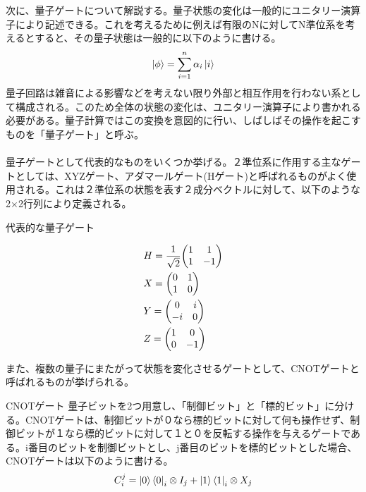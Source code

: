 \documentclass[a4paper,10.5pt]{article}
\numberwithin{equation}{section}
\begin{document}
次に、量子ゲートについて解説する。量子状態の変化は一般的にユニタリー演算子により記述できる。これを考えるために例えば有限のNに対してN準位系を考えるとすると、その量子状態は一般的に以下のように書ける。
\begin{equation}\begin{split}
    \ket{\phi} = \sum_{i=1}^{n} \alpha_{i} \ket{i}
\end{split} \end{equation}
量子回路は雑音による影響などを考えない限り外部と相互作用を行わない系として構成される。このため全体の状態の変化は、ユニタリー演算子により書かれる必要がある。量子計算ではこの変換を意図的に行い、しばしばその操作を起こすものを「量子ゲート」と呼ぶ。\\
\\
量子ゲートとして代表的なものをいくつか挙げる。２準位系に作用する主なゲートとしては、XYZゲート、アダマールゲート(Hゲート)と呼ばれるものがよく使用される。これは２準位系の状態を表す２成分ベクトルに対して、以下のような2×2行列により定義される。
\begin{examplebox}{代表的な量子ゲート}

 \begin{equation}\begin{split}
     &H = \frac{1}{\sqrt{2}}  \mqty(1 & 1 \\ 1 & -1) \\
     &X = \mqty(0 & 1 \\ 1 & 0) \\
     &Y = \mqty(0 & i \\ -i & 0) \\
     &Z = \mqty(1 & 0 \\ 0 & -1)
 \end{split} \end{equation}
\end{examplebox}
また、複数の量子にまたがって状態を変化させるゲートとして、CNOTゲートと呼ばれるものが挙げられる。
\begin{examplebox}{CNOTゲート}
量子ビットを2つ用意し、「制御ビット」と「標的ビット」に分ける。CNOTゲートは、制御ビットが０なら標的ビットに対して何も操作せず、制御ビットが１なら標的ビットに対して１と０を反転する操作を与えるゲートである。i番目のビットを制御ビットとし、j番目のビットを標的ビットとした場合、CNOTゲートは以下のように書ける。
 \begin{equation}\begin{split}
     C_{i}^{j} = \ket{0}\bra{0}_{i} \otimes I_{j} + \ket{1}\bra{1}_{i} \otimes X_{j}
 \end{split} \end{equation}
\end{examplebox}
\end{document}
